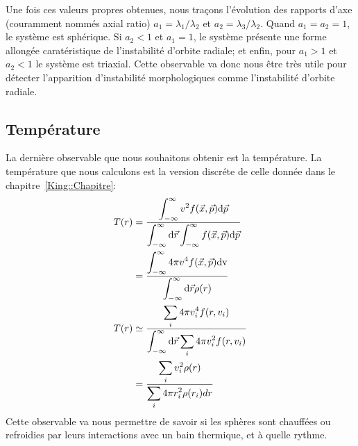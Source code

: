 			Une fois ces valeurs propres obtenues, nous traçons l'évolution des rapports d'axe (couramment nommés \og axial ratio\fg)
			$a_1 = \lambda_1 / \lambda_2$ et $a_2 = \lambda_3 / \lambda_2$. Quand $a_1 = a_2 = 1$, le
			système est sphérique. Si $a_2 < 1$ et $a_1 = 1$, le système présente une forme allongée
			caratéristique de l'instabilité d'orbite radiale; et enfin, pour $a_1 >
			1$ et $a_2 < 1$ le système est triaxial. Cette observable va donc nous être très utile pour
			détecter l'apparition d'instabilité morphologiques comme l'instabilité d'orbite radiale.

		\subsection{Température}

			La dernière observable que nous souhaitons obtenir est la température. La température que nous
			calculons est la version discréte de celle donnée dans le chapitre~\ref{King::Chapitre}:
			\begin{align}
				T(r) &= \dfrac{\displaystyle\int_{-\infty}^{\infty}v^2 f(\vec{x}, \vec{p})\mathrm{d}\vec{p}}{\displaystyle\int_{-\infty}^\infty\mathrm{d}\vec{r}\int_{-\infty}^{\infty}f(\vec{x}, \vec{p})\mathrm{d}\vec{p}} \\
				     &= \dfrac{\displaystyle\int_{-\infty}^{\infty}4\pi v^4 f(\vec{x}, \vec{p})\mathrm{dv}}{\displaystyle\int_{-\infty}^\infty\mathrm{d}\vec{r}\rho(r)} \\
				T(r) &\simeq \dfrac{\displaystyle\sum_i 4\pi v_i^4 f(r, v_i)}{\displaystyle\int_{-\infty}^\infty\mathrm{d}\vec{r}\sum_i 4\pi v_i^2 f(r, v_i)} \\
				     &= \dfrac{\displaystyle\sum_i v_i^2 \rho(r)}{\displaystyle\sum_i 4\pi r_i^2 \rho(r_i)dr}
			\end{align}
			Cette observable va nous permettre de savoir si les sphères sont chauffées ou refroidies par leurs
			interactions avec un bain thermique, et à quelle rythme.


